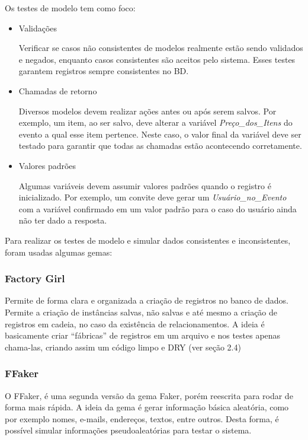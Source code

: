 Os testes de modelo tem como foco:
\begin{itemize}
\item Validações

Verificar se casos não consistentes de modelos realmente estão sendo validados e negados, enquanto casos consistentes são aceitos pelo sistema. Esses testes garantem registros sempre consistentes no BD.

\item Chamadas de retorno

Diversos modelos devem realizar ações antes ou após serem salvos. Por exemplo, um item, ao ser salvo, deve alterar a variável \textit{Preço\_dos\_Itens} do evento a qual esse item pertence. Neste caso, o valor final da variável deve ser testado para garantir que todas as chamadas estão acontecendo corretamente.

\item Valores padrões

Algumas variáveis devem assumir valores padrões quando o registro é inicializado. Por exemplo, um convite deve gerar um \textit{Usuário\_no\_Evento} com a variável confirmado em um valor padrão para o caso do usuário ainda não ter dado a resposta.
\end{itemize}

Para realizar os testes de modelo e simular dados consistentes e inconsistentes, foram usadas algumas gemas:

\subsubsection{Factory Girl~\cite{factory_girl}}

Permite de forma clara e organizada a criação de registros no banco de dados. Permite a criação de instâncias salvas, não salvas e até mesmo a criação de registros em cadeia, no caso da existência de relacionamentos. A ideia é basicamente criar ``fábricas'' de registros em um arquivo e nos testes apenas chama-las, criando assim um código limpo e DRY (ver seção 2.4)

\subsubsection{FFaker~\cite{ffaker}}

O FFaker, é uma segunda versão da gema Faker, porém reescrita para rodar de forma mais rápida. A ideia da gema é gerar informação básica aleatória, como por exemplo nomes, e-mails, endereços, textos, entre outros. Desta forma, é possível simular informações pseudoaleatórias para testar o sistema.


